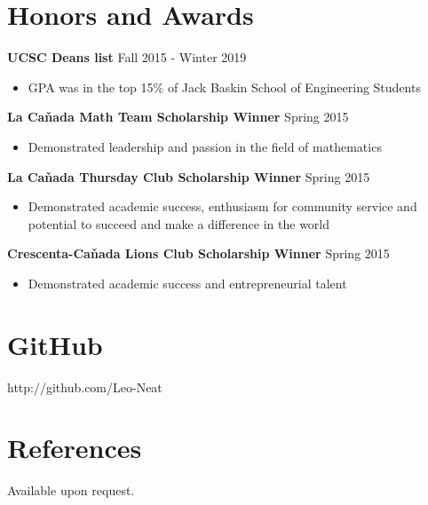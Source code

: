 \documentclass[mm,line]{res}
\begin{document}
\begin{resume}
\section{Honors and Awards}
{\bf UCSC Deans list} \hfill{Fall 2015 - Winter 2019}
\begin{itemize}
	\item  GPA was in the top 15\% of Jack Baskin School of Engineering Students
\end{itemize}
{\bf La Ca\v{n}ada Math Team Scholarship Winner} \hfill{Spring 2015}
\begin{itemize}
	\item  Demonstrated leadership and passion in the field of mathematics 
\end{itemize}
{\bf La Ca\v{n}ada Thursday Club Scholarship Winner} \hfill{Spring 2015}
\begin{itemize}
	\item  Demonstrated academic success, enthusiasm for community service and potential to succeed and make a difference in the world
\end{itemize}
{\bf Crescenta-Ca\v{n}ada Lions Club Scholarship Winner} \hfill{Spring 2015}
\begin{itemize}
	\item  Demonstrated academic success and entrepreneurial talent  
\end{itemize}



\section{\sc GitHub}
http://github.com/Leo-Neat



\section{\sc References }
Available upon request.

\end{resume}
\end{document}
